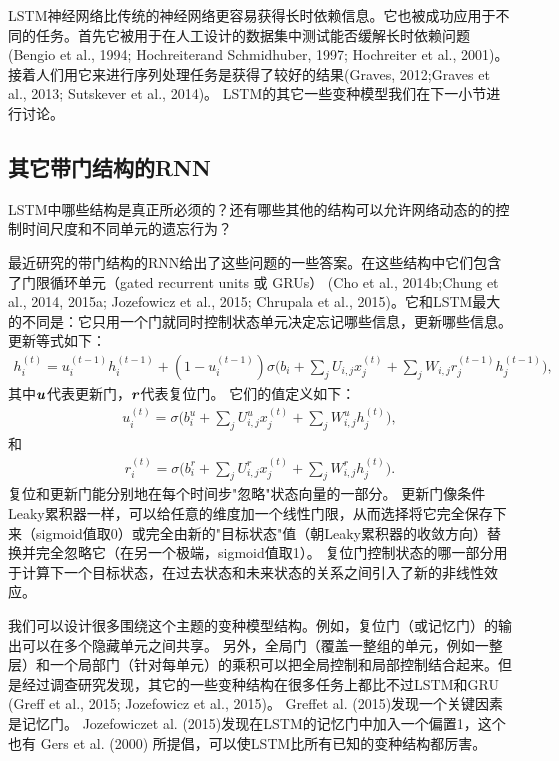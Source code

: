 LSTM神经网络比传统的神经网络更容易获得长时依赖信息。它也被成功应用于不同的任务。首先它被用于在人工设计的数据集中测试能否缓解长时依赖问题(Bengio et al., 1994; Hochreiterand Schmidhuber, 1997; Hochreiter et al., 2001)。接着人们用它来进行序列处理任务是获得了较好的结果(Graves, 2012;Graves et al., 2013; Sutskever et al., 2014)。 LSTM的其它一些变种模型我们在下一小节进行讨论。


\subsection{其它带门结构的RNN}
\label{sec:10.10.2}
LSTM中哪些结构是真正所必须的？还有哪些其他的结构可以允许网络动态的的控制时间尺度和不同单元的遗忘行为？

最近研究的带门结构的RNN给出了这些问题的一些答案。在这些结构中它们包含了门限循环单元（gated recurrent units 或 GRUs） (Cho et al., 2014b;Chung et al., 2014, 2015a; Jozefowicz et al., 2015; Chrupala et al., 2015)。它和LSTM最大的不同是：它只用一个门就同时控制状态单元决定忘记哪些信息，更新哪些信息。更新等式如下：
\begin{align}
 h_i^{(t)} = u_i^{(t-1)} h_i^{(t-1)} + (1 - u_i^{(t-1)}) \sigma 
 \Big( b_i + \sum_j U_{i,j} x_j^{(t)} + \sum_j W_{i,j} r_j^{(t-1)} h_j^{(t-1)} \Big),
\end{align}
其中$\boldsymbol{\mathit{u}}$代表更新门，$\boldsymbol{\mathit{r}}$代表复位门。
它们的值定义如下：
\begin{align}
 u_i^{(t)} = \sigma \Big( b_i^u + \sum_j U_{i,j}^u x_j^{(t)} + \sum_j W_{i,j}^u h_j^{(t)} \Big),
\end{align}
和
\begin{align}
 r_i^{(t)} = \sigma \Big( b_i^r + \sum_j U_{i,j}^r x_j^{(t)} + \sum_j W_{i,j}^r h_j^{(t)} \Big).
\end{align}
复位和更新门能分别地在每个时间步"忽略"状态向量的一部分。
更新门像条件Leaky累积器一样，可以给任意的维度加一个线性门限，从而选择将它完全保存下来（sigmoid值取0）或完全由新的"目标状态"值（朝Leaky累积器的收敛方向）替换并完全忽略它（在另一个极端，sigmoid值取1）。
复位门控制状态的哪一部分用于计算下一个目标状态，在过去状态和未来状态的关系之间引入了新的非线性效应。

我们可以设计很多围绕这个主题的变种模型结构。例如，复位门（或记忆门）的输出可以在多个隐藏单元之间共享。
另外，全局门（覆盖一整组的单元，例如一整层）和一个局部门（针对每单元）的乘积可以把全局控制和局部控制结合起来。但是经过调查研究发现，其它的一些变种结构在很多任务上都比不过LSTM和GRU (Greﬀ et al., 2015; Jozefowicz et al., 2015)。 Greﬀet al. (2015)发现一个关键因素是记忆门。 Jozefowiczet al. (2015)发现在LSTM的记忆门中加入一个偏置1，这个也有 Gers et al. (2000) 所提倡，可以使LSTM比所有已知的变种结构都厉害。

